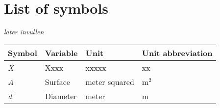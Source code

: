 \section*{List of symbols}
\thispagestyle{empty}
\textit{later invullen}\\
\begin{tabular}{| p{4cm} | p{4cm} | p{4cm} | p{4cm} |}
\hline
\large\textbf{Symbol} & \large\textbf{Variable} & \large\textbf{Unit} & \large\textbf{Unit abbreviation} \\
\hline\hline
\textit{X}			& Xxxx				& xxxxx					    & xx	 \\ \hline
\textit{A}			& Surface			& meter squared			    & m$^{2}$ \\ \hline
\textit{d}			& Diameter			& meter							& m   \\ \hline
\end{tabular}
\newpage